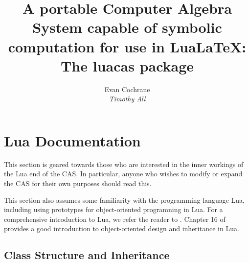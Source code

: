 \documentclass{article}
\begin{document}
\title{A portable Computer Algebra System capable of symbolic computation for use in Lua\LaTeX{}: \\  The {\ttfamily luacas} package }
\author{Evan Cochrane \\ {\itshape Timothy All}}
\date{} 

\maketitle 

\tableofcontents











\appendix


    
\section{Lua Documentation}

This section is geared towards those who are interested in the inner workings of the Lua end of the CAS. In particular, anyone who wishes to modify or expand the CAS for their own purposes should read this.
 
This section also assumes some familiarity with the programming language Lua, including using prototypes for object-oriented programning in Lua. For a comprehensive introduction to Lua, we refer the reader to \cite{pil}. Chapter 16 of \cite{pil} provides a good introduction to object-oriented design and inheritance in Lua. 
 
 \subsection{Class Structure and Inheritance}
 
\end{document}
